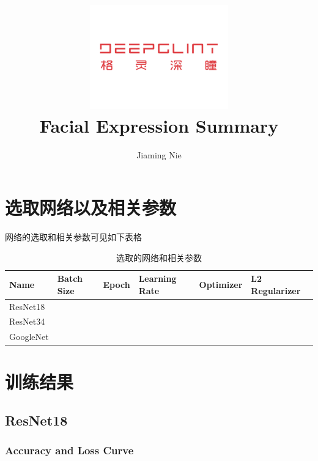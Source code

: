 \documentclass[11pt, a4paper]{article}
\title{\includegraphics[width=0.45\textwidth]{dg}
        \\Facial Expression Summary   }          %
\author{Jiaming Nie}                    %
\begin{document}
\begin{titlepage}
	
\maketitle
{}

\thispagestyle{empty}  %

\end{titlepage}




\begin{CJK}{UTF8}{gbsn}

\section{选取网络以及相关参数}
网络的选取和相关参数可见如下表格

\begin{table}[htbp] 
	\begin{center}
		\caption{选取的网络和相关参数}
		\begin{tabular}{| l | l | l | l | l | l |}  \hline
	  Name & Batch Size & Epoch & Learning Rate & Optimizer & L2 Regularizer \\ \hline
	  ResNet18 &     &     &  & & \\ \hline
	  ResNet34 &     &     &  & & \\ \hline
	  GoogleNet &  &   &  &  & \\ \hline
		\end{tabular}
		
		\label{tab:kf_meaning2}
	\end{center}
\end{table}	

\section{训练结果}

\subsection{ResNet18}

\subsubsection{Accuracy and Loss Curve}


\end{CJK}
\end{document}
